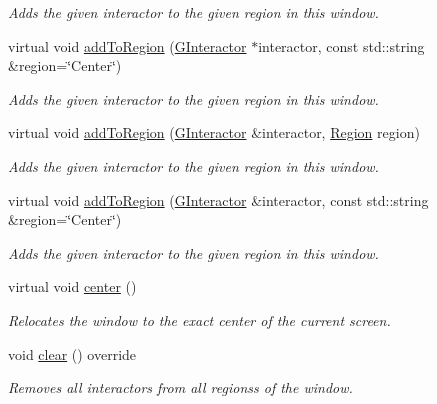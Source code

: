 \begin{DoxyCompactItemize}
\begin{DoxyCompactList}\small\item\em Adds the given interactor to the given region in this window. \end{DoxyCompactList}\item 
virtual void \mbox{\hyperlink{classsgl_1_1GWindow_a9c8e600889001e6e72d3548918a6baff}{add\+To\+Region}} (\mbox{\hyperlink{classsgl_1_1GInteractor}{G\+Interactor}} $\ast$interactor, const std\+::string \&region=\char`\"{}Center\char`\"{})
\begin{DoxyCompactList}\small\item\em Adds the given interactor to the given region in this window. \end{DoxyCompactList}\item 
virtual void \mbox{\hyperlink{classsgl_1_1GWindow_ad05df0d92ab2fba95d401a5614365558}{add\+To\+Region}} (\mbox{\hyperlink{classsgl_1_1GInteractor}{G\+Interactor}} \&interactor, \mbox{\hyperlink{classsgl_1_1GWindow_a81a01a86de31071a92e6cce0bab9bc4b}{Region}} region)
\begin{DoxyCompactList}\small\item\em Adds the given interactor to the given region in this window. \end{DoxyCompactList}\item 
virtual void \mbox{\hyperlink{classsgl_1_1GWindow_a667ed0065e0bbb52a893904e7f2383bb}{add\+To\+Region}} (\mbox{\hyperlink{classsgl_1_1GInteractor}{G\+Interactor}} \&interactor, const std\+::string \&region=\char`\"{}Center\char`\"{})
\begin{DoxyCompactList}\small\item\em Adds the given interactor to the given region in this window. \end{DoxyCompactList}\item 
virtual void \mbox{\hyperlink{classsgl_1_1GWindow_a5013a22e5b1f902226b7394353f884ff}{center}} ()
\begin{DoxyCompactList}\small\item\em Relocates the window to the exact center of the current screen. \end{DoxyCompactList}\item 
void \mbox{\hyperlink{classsgl_1_1GWindow_aee7cb2065b88d21ac4ad05bc997ecf82}{clear}} () override
\begin{DoxyCompactList}\small\item\em Removes all interactors from all regionss of the window. \end{DoxyCompactList}\item 

\end{DoxyCompactItemize}
